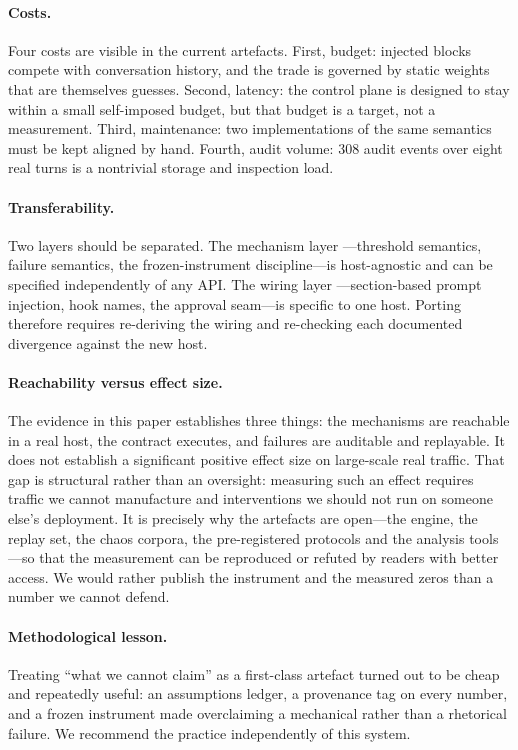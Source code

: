 \paragraph{Costs.} Four costs are visible in the current artefacts. First,
budget: injected blocks compete with conversation history, and the trade is
governed by static weights that are themselves guesses. Second, latency: the
control plane is designed to stay within a small self-imposed budget, but that
budget is a target, not a measurement. Third, maintenance: two implementations
of the same semantics must be kept aligned by hand. Fourth, audit volume: 308
audit events over eight real turns is a nontrivial storage and inspection load.

\paragraph{Transferability.} Two layers should be separated. The mechanism layer
---threshold semantics, failure semantics, the frozen-instrument discipline---is
host-agnostic and can be specified independently of any API. The wiring layer
---section-based prompt injection, hook names, the approval seam---is specific
to one host. Porting therefore requires re-deriving the wiring and re-checking
each documented divergence against the new host.

\paragraph{Reachability versus effect size.} The evidence in this paper
establishes three things: the mechanisms are reachable in a real host, the
contract executes, and failures are auditable and replayable. It does not
establish a significant positive effect size on large-scale real traffic. That
gap is structural rather than an oversight: measuring such an effect requires
traffic we cannot manufacture and interventions we should not run on someone
else's deployment. It is precisely why the artefacts are open---the engine, the
replay set, the chaos corpora, the pre-registered protocols and the analysis
tools---so that the measurement can be reproduced or refuted by readers with
better access. We would rather publish the instrument and the measured zeros
than a number we cannot defend.

\paragraph{Methodological lesson.} Treating ``what we cannot claim'' as a
first-class artefact turned out to be cheap and repeatedly useful: an
assumptions ledger, a provenance tag on every number, and a frozen instrument
made overclaiming a mechanical rather than a rhetorical failure. We recommend
the practice independently of this system.
